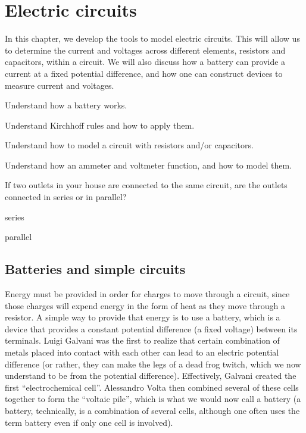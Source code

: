 \chapter{Electric circuits}
\label{chapter:circuits}
In this chapter, we develop the tools to model electric circuits. This will allow us to determine the current and voltages across different elements, resistors and capacitors, within a circuit. We will also discuss how a battery can provide a current at a fixed potential difference, and how one can construct devices to measure current and voltages.

\begin{learningObjectives}{
 \item Understand how a battery works.
 \item Understand Kirchhoff rules and how to apply them.
 \item Understand how to model a circuit with resistors and/or capacitors.
 \item Understand how an ammeter and voltmeter function, and how to model them.
 }
\end{learningObjectives}

\begin{opening}
\begin{MCquestion}{If two outlets in your house are connected to the same circuit, are the outlets connected in series or in parallel?}
\item series
\item parallel \correct
\end{MCquestion}
\end{opening}

\section{Batteries and simple circuits}
Energy must be provided in order for charges to move through a circuit, since those charges will expend energy in the form of heat as they move through a resistor. A simple way to provide that energy is to use a battery, which is a device that provides a constant potential difference (a fixed voltage) between its terminals. Luigi Galvani was the first to realize that certain combination of metals placed into contact with each other can lead to an electric potential difference (or rather, they can make the legs of a dead frog twitch, which we now understand to be from the potential difference). Effectively, Galvani created the first ``electrochemical cell''. Alessandro Volta then combined several of these cells together to form the ``voltaic pile'', which is what we would now call a battery (a battery, technically, is a combination of several cells, although one often uses the term battery even if only one cell is involved). 
